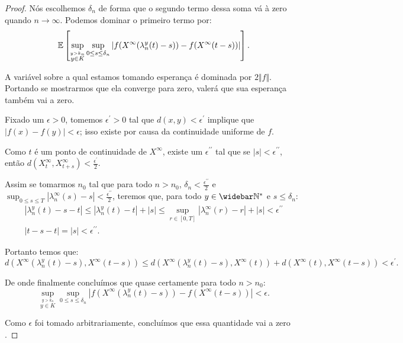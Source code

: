 \begin{proof}
  Nós escolhemos $\delta_n$ de forma que o segundo termo dessa soma vá
  à zero quando $n \to \infty$. Podemos dominar o primeiro termo por:
  \begin{displaymath}
     {\mathbb{E}} \left[ \sup_{\stackrel{y > k_n}{y\in K}}
      \sup_{0 \leq s \leq \delta_n} \left\lvert
        f(X^\infty(\lambda_n^y(t)-s)) -
        f(X^\infty(t-s))
    \right\rvert \right].
  \end{displaymath}

  A variável sobre a qual estamos tomando esperança é dominada por
  $2\Vert f \Vert$. Portando se mostrarmos que ela converge \qc para
  zero, valerá que sua esperança também vai a zero.

  Fixado um $\epsilon > 0$, tomemos $\epsilon^\prime > 0$ tal que
  $d(x, y) < \epsilon^\prime$ implique que $|f(x) - f(y)| < \epsilon$;
  isso existe por causa da continuidade uniforme de $f$.
 
  Como $t$ é \qc um ponto de continuidade de $X^\infty$, existe um
  $\epsilon^{\prime\prime}$ tal que se $|s| <
  \epsilon^{\prime\prime}$, então $d(X^\infty_t, X^\infty_{t+s}) <
  \frac{\epsilon^{\prime}}{2}$.

  Assim se tomarmos $n_0$ tal que para todo $n > n_0$, $\delta_{n} <
  \frac{\epsilon^{\prime\prime}}{2}$ e $\sup_{0 \leq s \leq T}
  |\lambda_n^\infty(s) - s| < \frac{\epsilon^{\prime\prime}}{2}$, teremos
  que, para todo $y\in\Nzb$ e $s \leq \delta_n$:
  \begin{gather*}
    |\lambda_n^y(t) - s - t| \leq 
     |\lambda_n^y(t) - t | + |s| \leq
     \sup_{r \in [0, T]} |\lambda_n^\infty(r) - r | + |s|
     < \epsilon^{\prime\prime}\\
    |t - s - t |  = |s| < \epsilon^{\prime\prime}.
  \end{gather*}
  
  Portanto temos que:
  \begin{displaymath}
    d(X^\infty(\lambda_n^y(t)-s), X^\infty(t-s)) \leq
     d(X^\infty(\lambda_n^y(t)-s), X^\infty(t))+
     d(X^\infty(t), X^\infty(t-s))
     < \epsilon^{\prime}.
  \end{displaymath}

  De onde finalmente concluímos que quase certamente para todo $n > n_0$:
  \begin{displaymath} 
    \sup_{\stackrel{y > k_n}{y \in K}}
    \sup_{0 \leq s \leq \delta_n} \left\lvert
      f(X^\infty(\lambda_n^y(t)-s)) -
      f(X^\infty(t-s))
    \right\rvert < \epsilon .
  \end{displaymath}

  Como $\epsilon$ foi tomado arbitrariamente, concluímos que essa
  quantidade vai a zero \qc.
\end{proof}

